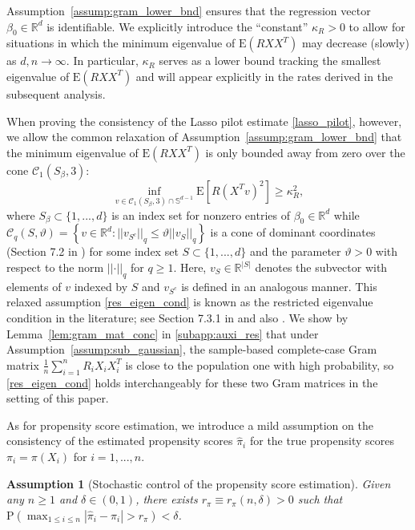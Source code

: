 \documentclass[ejsv2,noshowframe]{imsart}
\theoremstyle{plain}
\newtheorem{assumption}{Assumption}
\theoremstyle{definition}
\theoremstyle{remark}
\newcommand{\norm}[1]{\left|\left| #1 \right|\right|}
\renewcommand{\hat}{\widehat}
\begin{document}
Assumption~\ref{assump:gram_lower_bnd} ensures that the regression vector $\beta_0\in \mathbb{R}^d$ is identifiable. We explicitly introduce the ``constant'' $\kappa_R >0$ to allow for situations in which the minimum eigenvalue of $\mathrm{E}\left(RXX^T\right)$ may decrease (slowly) as $d,n\to\infty$. In particular, $\kappa_R$ serves as a lower bound tracking the smallest eigenvalue of $\mathrm{E}\left(RXX^T\right)$ and will appear explicitly in the rates derived in the subsequent analysis.

When proving the consistency of the Lasso pilot estimate \eqref{lasso_pilot}, however, we allow the common relaxation of Assumption~\ref{assump:gram_lower_bnd} that the minimum eigenvalue of $\mathrm{E}\left(RXX^T\right)$ is only bounded away from zero over the cone $\mathcal{C}_1(S_{\beta},3)$:
\begin{equation}
	\label{res_eigen_cond}
	\inf_{v\in \mathcal{C}_1(S_{\beta},3) \cap \mathbb{S}^{d-1}} \mathrm{E}\left[R(X^Tv)^2\right] \geq \kappa_R^2,
\end{equation}
where $S_{\beta} \subset \{1,...,d\}$ is an index set for nonzero entries of $\beta_0\in \mathbb{R}^d$ while $\mathcal{C}_q(S,\vartheta) = \left\{v\in \mathbb{R}^d: \norm{v_{S^c}}_q \leq \vartheta \norm{v_S}_q\right\}$ is a cone of dominant coordinates (Section 7.2 in \citealt{koltchinskii2011oracle}) for some index set $S \subset \{1,...,d\}$ and the parameter $\vartheta >0$ with respect to the norm $\norm{\cdot}_q$ for $q\geq 1$. Here, $v_S \in \mathbb{R}^{|S|}$ denotes the subvector with elements of $v$ indexed by $S$ and $v_{S^c}$ is defined in an analogous manner. This relaxed assumption \eqref{res_eigen_cond} is known as the restricted eigenvalue condition in the literature; see Section 7.3.1 in \cite{wainwright2019high} and also \cite{bickel2009simultaneous,van2009conditions}. We show by Lemma~\ref{lem:gram_mat_conc} in \autoref{subapp:auxi_res} that under Assumption~\ref{assump:sub_gaussian}, the sample-based complete-case Gram matrix $\frac{1}{n}\sum_{i=1}^n R_iX_iX_i^T$ is close to the population one with high probability, so \eqref{res_eigen_cond} holds interchangeably for these two Gram matrices in the setting of this paper.


As for propensity score estimation, we introduce a mild assumption on the consistency of the estimated propensity scores $\hat{\pi}_i$ for the true propensity scores $\pi_i=\pi(X_i)$ for $i=1,...,n$. 

\begin{assumption}[Stochastic control of the propensity score estimation]
	\label{assump:prop_consistent_rate}
	Given any $n\geq 1$ and $\delta \in (0,1)$, there exists $r_{\pi} \equiv r_{\pi}(n,\delta) >0$ such that $\mathrm{P}\left(\max_{1 \leq i \leq n}\left|\hat{\pi}_i -\pi_i \right| > r_{\pi}\right) <\delta$.
\end{assumption}
\end{document}

